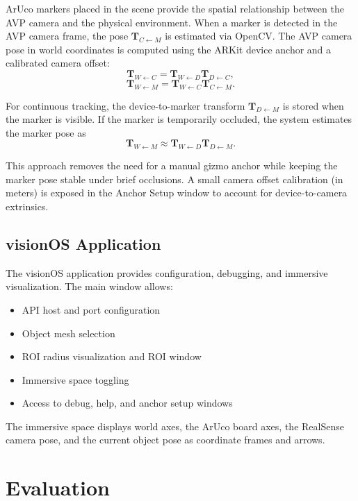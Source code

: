 \documentclass[11pt]{article}
\begin{document}
ArUco markers placed in the scene provide the spatial relationship between the AVP camera and the physical environment. When a marker is detected in the AVP camera frame, the pose $\mathbf{T}_{C \leftarrow M}$ is estimated via OpenCV. The AVP camera pose in world coordinates is computed using the ARKit device anchor and a calibrated camera offset:
\[
\mathbf{T}_{W \leftarrow C} = \mathbf{T}_{W \leftarrow D} \mathbf{T}_{D \leftarrow C},
\]
\[
\mathbf{T}_{W \leftarrow M} = \mathbf{T}_{W \leftarrow C}\mathbf{T}_{C \leftarrow M}.
\]

For continuous tracking, the device-to-marker transform $\mathbf{T}_{D \leftarrow M}$ is stored when the marker is visible. If the marker is temporarily occluded, the system estimates the marker pose as
\[
\mathbf{T}_{W \leftarrow M} \approx \mathbf{T}_{W \leftarrow D} \mathbf{T}_{D \leftarrow M}.
\]

This approach removes the need for a manual gizmo anchor while keeping the marker pose stable under brief occlusions. A small camera offset calibration (in meters) is exposed in the Anchor Setup window to account for device-to-camera extrinsics.

\subsection{visionOS Application}

The visionOS application provides configuration, debugging, and immersive visualization. The main window allows:

\begin{itemize}
    \item API host and port configuration
    \item Object mesh selection
    \item ROI radius visualization and ROI window
    \item Immersive space toggling
    \item Access to debug, help, and anchor setup windows
\end{itemize}

The immersive space displays world axes, the ArUco board axes, the RealSense camera pose, and the current object pose as coordinate frames and arrows.

\section{Evaluation}
\label{sec:evaluation}
\end{document}
